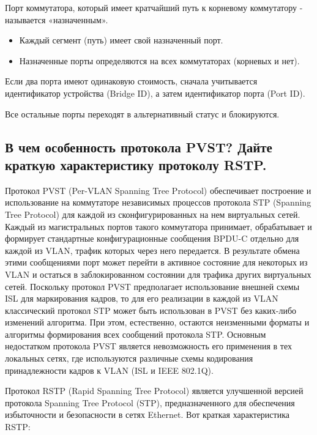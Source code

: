 Порт коммутатора, который имеет кратчайший путь к корневому 
коммутатору - называется «назначенным».

\begin{itemize}
	\item Каждый сегмент (путь) имеет свой назначенный порт.
	\item Назначенные порты определяются на всех коммутаторах 
		(корневых и нет).
\end{itemize}

Если два порта имеют одинаковую стоимость, сначала учитывается 
идентификатор устройства (Bridge ID), а затем идентификатор порта (Port 
ID).\par
Все остальные порты переходят в альтернативный статус и блокируются.

\subsection{В чем особенность протокола PVST? Дайте краткую характеристику 
протоколу RSTP.}

Протокол PVST (Per-VLAN Spanning Tree Protocol) обеспечивает 
построение и использование на коммутаторе независимых процессов 
протокола STP (Spanning Tree Protocol) для каждой из 
сконфигурированных на нем виртуальных сетей. Каждый из 
магистральных портов такого коммутатора принимает, обрабатывает и 
формирует стандартные конфигурационные сообщения BPDU-C отдельно 
для каждой из VLAN, трафик которых через него передается. В результате 
обмена этими сообщениями порт может перейти в активное состояние для 
некоторых из VLAN и остаться в заблокированном состоянии для трафика 
других виртуальных сетей. Поскольку протокол PVST предполагает 
использование внешней схемы ISL для маркирования кадров, то для его 
реализации в каждой из VLAN классический протокол STP может быть 
использован в PVST без каких-либо изменений алгоритма. При этом, 
естественно, остаются неизменными форматы и алгоритмы формирования 
всех сообщений протокола STP. Основным недостатком протокола PVST 
является невозможность его применения в тех локальных сетях, где 
используются различные схемы кодирования принадлежности кадров к 
VLAN (ISL и IEEE 802.1Q).\par
Протокол RSTP (Rapid Spanning Tree Protocol) является улучшенной 
версией протокола Spanning Tree Protocol (STP), предназначенного для 
обеспечения избыточности и безопасности в сетях Ethernet. Вот краткая 
характеристика RSTP:

